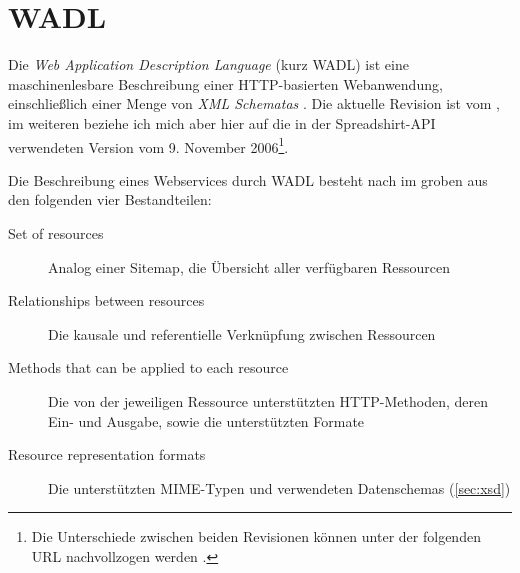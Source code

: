 \section{WADL}
\label{sec:wadl}

Die \emph{Web Application Description Language} (kurz \gls{WADL}) ist eine maschinenlesbare Beschreibung einer HTTP-basierten Webanwendung, einschließlich einer Menge von \emph{XML Schematas} \cite{hadleyWADL}.
Die aktuelle Revision ist vom , im weiteren beziehe ich mich aber hier auf die in der Spreadshirt-API verwendeten Version vom 9. November 2006\footnote{Die Unterschiede zwischen beiden Revisionen können unter der folgenden URL nachvollzogen werden .}.

Die Beschreibung eines Webservices durch WADL besteht nach \cite{hadleyWADL} im groben aus den folgenden vier Bestandteilen:
\begin{description}
     \item[Set of resources] Analog einer Sitemap, die Übersicht aller verfügbaren Ressourcen
     \item[Relationships between resources] Die kausale und referentielle Verknüpfung zwischen Ressourcen
     \item[Methods that can be applied to each resource] Die von der jeweiligen Ressource unterstützten HTTP-Methoden, deren Ein- und Ausgabe, sowie die unterstützten Formate
     \item[Resource representation formats] Die unterstützten \gls{MIME}-Typen und verwendeten Datenschemas (\cref{sec:xsd})
 \end{description} 

